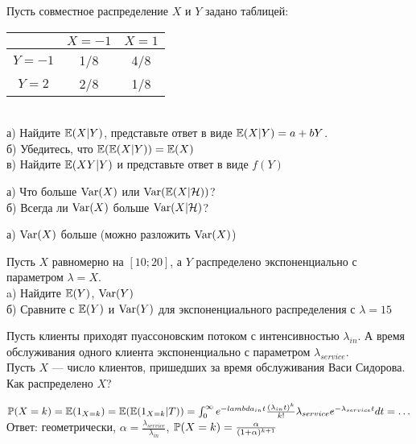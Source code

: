 \begin{problem}
 Пусть совместное распределение $X$ и $Y$ задано таблицей: \\
\begin{tabular}{|c|c|c|}
  \hline
   & $X=-1$ & $X=1$ \\
  \hline
  $Y=-1$ & 1/8 & 4/8 \\
  $Y=2$ & 2/8 & 1/8 \\
  \hline
\end{tabular} \\
а) Найдите $\E(X|Y)$, представьте ответ в виде $\E(X|Y)=a+bY$. \\
б) Убедитесь, что $\E(\E(X|Y))=\E(X)$ \\
в) Найдите $\E(XY|Y)$ и представьте ответ в виде $f(Y)$ 
\end{problem} 
\begin{solution} 

\end{solution}

\begin{problem}
а) Что больше $\Var(X)$ или $\Var(\E(X|\mathcal{H}))$? \\
б) Всегда ли $\Var(X)$ больше $\Var(X|\mathcal{H})$? 
\end{problem} 
\begin{solution} 

 а) $\Var(X)$ больше (можно разложить $\Var(X)$)
\end{solution}

\begin{problem}
Пусть $X$ равномерно на $[10;20]$, а $Y$ распределено экспоненциально с параметром $\lambda=X$. \\
a) Найдите $\E(Y)$, $\Var(Y)$ \\
б) Сравните с $\E(Y)$ и $\Var(Y)$ для экспоненциального распределения с $\lambda=15$ 
\end{problem} 
\begin{solution} 

\end{solution}

\begin{problem}
Пусть клиенты приходят пуассоновским потоком с интенсивностью $\lambda_{in}$. А время обслуживания одного клиента экспоненциально с параметром $\lambda_{service}$. \\
Пусть $X$ --- число клиентов, пришедших за время обслуживания Васи Сидорова. \\
Как распределено $X$? 
\end{problem} 
\begin{solution} 

$\P(X=k)=\E(1_{X=k})=\E(\E(1_{X=k}|T))=\int_{0}^{\infty}e^{-lambda_{in}t}\frac{(\lambda_{in}t)^{k}}{k!}\lambda_{service}e^{-\lambda_{service}t}dt=\ldots$ \\
Ответ: геометрически, $\alpha=\frac{\lambda_{service}}{\lambda_{in}}$, $\P(X=k)=\frac{\alpha}{(1+\alpha)^{k+1}}$ 
\end{solution}

